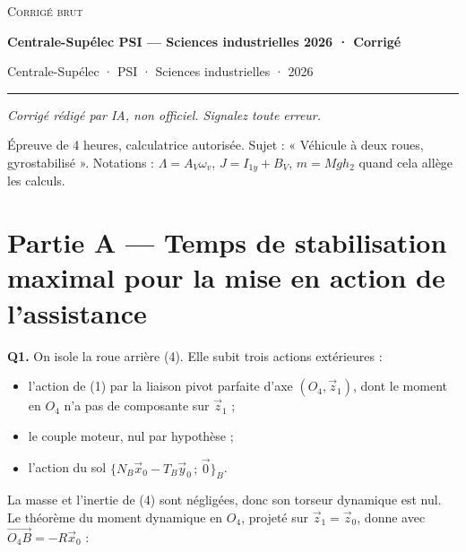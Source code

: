\documentclass[11pt,a4paper]{article}
\providecommand{\tightlist}{\setlength{\itemsep}{0pt}\setlength{\parskip}{0pt}}
\newcommand{\equationajustee}[1]{%
  \sbox{\boiteequation}{$\displaystyle #1$}%
  \ifdim\wd\boiteequation>\linewidth
    \[\resizebox{\linewidth}{!}{\usebox{\boiteequation}}\]%
  \else
    \[#1\]%
  \fi}
\begin{document}
\thispagestyle{plain}
\begin{center}
  {\small\scshape Corrigé brut}\par\smallskip
  {\LARGE\bfseries Centrale-Supélec PSI — Sciences industrielles 2026 · Corrigé\par}\medskip
  {\large Centrale-Supélec · PSI · Sciences industrielles · 2026\par}
\end{center}
\vspace{2pt}\hrule\vspace{8pt}

\emph{Corrigé rédigé par IA, non officiel. Signalez toute erreur.}

Épreuve de 4 heures, calculatrice autorisée. Sujet : « Véhicule à deux roues, gyrostabilisé ». Notations : \(\Lambda=A_V\omega_v\), \(J=I_{1y}+B_V\), \(m=Mgh_2\) quand cela allège les calculs.

\hypertarget{partie-a-temps-de-stabilisation-maximal-pour-la-mise-en-action-de-lassistance}{%
\section{Partie A --- Temps de stabilisation maximal pour la mise en action de l'assistance}\label{partie-a-temps-de-stabilisation-maximal-pour-la-mise-en-action-de-lassistance}}

\textbf{Q1.} On isole la roue arrière (4). Elle subit trois actions extérieures :

\begin{itemize}
\tightlist
\item
  l'action de (1) par la liaison pivot parfaite d'axe \((O_4,\vec z_1)\), dont le moment en \(O_4\) n'a pas de composante sur \(\vec z_1\) ;
\item
  le couple moteur, nul par hypothèse ;
\item
  l'action du sol \(\{N_B\vec x_0-T_B\vec y_0\,;\,\vec 0\}_B\).
\end{itemize}

La masse et l'inertie de (4) sont négligées, donc son torseur dynamique est nul. Le théorème du moment dynamique en \(O_4\), projeté sur \(\vec z_1=\vec z_0\), donne avec \(\overrightarrow{O_4B}=-R\vec x_0\) :

\equationajustee{\begin{aligned}0&=\big[(-R\vec x_0)\wedge(N_B\vec x_0-T_B\vec y_0)\big]\cdot\vec z_0\\&=R\,T_B .\end{aligned}}
\end{document}

